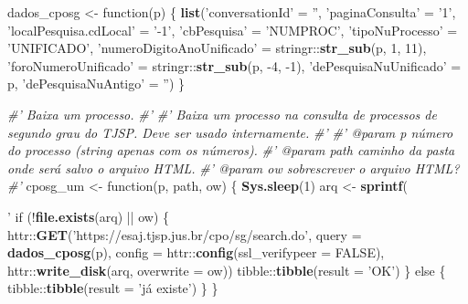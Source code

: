 \documentclass[]{book}
\newenvironment{Shaded}{\begin{snugshade}}{\end{snugshade}}
\newcommand{\KeywordTok}[1]{\textcolor[rgb]{0.13,0.29,0.53}{\textbf{{#1}}}}
\newcommand{\DataTypeTok}[1]{\textcolor[rgb]{0.13,0.29,0.53}{{#1}}}
\newcommand{\DecValTok}[1]{\textcolor[rgb]{0.00,0.00,0.81}{{#1}}}
\newcommand{\StringTok}[1]{\textcolor[rgb]{0.31,0.60,0.02}{{#1}}}
\newcommand{\CommentTok}[1]{\textcolor[rgb]{0.56,0.35,0.01}{\textit{{#1}}}}
\newcommand{\OtherTok}[1]{\textcolor[rgb]{0.56,0.35,0.01}{{#1}}}
\newcommand{\NormalTok}[1]{{#1}}
\begin{document}
\begin{Shaded}
\begin{Highlighting}[]
\NormalTok{dados_cposg <-}\StringTok{ }\NormalTok{function(p) \{}
  \KeywordTok{list}\NormalTok{(}\StringTok{'conversationId'} \NormalTok{=}\StringTok{ ''}\NormalTok{,}
       \StringTok{'paginaConsulta'} \NormalTok{=}\StringTok{ '1'}\NormalTok{,}
       \StringTok{'localPesquisa.cdLocal'} \NormalTok{=}\StringTok{ '-1'}\NormalTok{,}
       \StringTok{'cbPesquisa'} \NormalTok{=}\StringTok{ 'NUMPROC'}\NormalTok{,}
       \StringTok{'tipoNuProcesso'} \NormalTok{=}\StringTok{ 'UNIFICADO'}\NormalTok{,}
       \StringTok{'numeroDigitoAnoUnificado'} \NormalTok{=}\StringTok{ }\NormalTok{stringr::}\KeywordTok{str_sub}\NormalTok{(p, }\DecValTok{1}\NormalTok{, }\DecValTok{11}\NormalTok{),}
       \StringTok{'foroNumeroUnificado'} \NormalTok{=}\StringTok{ }\NormalTok{stringr::}\KeywordTok{str_sub}\NormalTok{(p, -}\DecValTok{4}\NormalTok{, -}\DecValTok{1}\NormalTok{),}
       \StringTok{'dePesquisaNuUnificado'} \NormalTok{=}\StringTok{ }\NormalTok{p,}
       \StringTok{'dePesquisaNuAntigo'} \NormalTok{=}\StringTok{ ''}\NormalTok{)}
\NormalTok{\}}

\CommentTok{#' Baixa um processo.}
\CommentTok{#'}
\CommentTok{#' Baixa um processo na consulta de processos de segundo grau do TJSP. Deve ser usado internamente.}
\CommentTok{#'}
\CommentTok{#' @param p número do processo (string apenas com os números).}
\CommentTok{#' @param path caminho da pasta onde será salvo o arquivo HTML.}
\CommentTok{#' @param ow sobrescrever o arquivo HTML?}
\CommentTok{#'}
\NormalTok{cposg_um <-}\StringTok{ }\NormalTok{function(p, path, ow) \{}
  \KeywordTok{Sys.sleep}\NormalTok{(}\DecValTok{1}\NormalTok{)}
  \NormalTok{arq <-}\StringTok{ }\KeywordTok{sprintf}\NormalTok{(}\StringTok{'%s/%s.html'}\NormalTok{, path, p)}
  \NormalTok{if (!}\KeywordTok{file.exists}\NormalTok{(arq) ||}\StringTok{ }\NormalTok{ow) \{}
    \NormalTok{httr::}\KeywordTok{GET}\NormalTok{(}\StringTok{'https://esaj.tjsp.jus.br/cpo/sg/search.do'}\NormalTok{,}
              \DataTypeTok{query =} \KeywordTok{dados_cposg}\NormalTok{(p),}
              \DataTypeTok{config =} \NormalTok{httr::}\KeywordTok{config}\NormalTok{(}\DataTypeTok{ssl_verifypeer =} \OtherTok{FALSE}\NormalTok{),}
              \NormalTok{httr::}\KeywordTok{write_disk}\NormalTok{(arq, }\DataTypeTok{overwrite =} \NormalTok{ow))}
    \NormalTok{tibble::}\KeywordTok{tibble}\NormalTok{(}\DataTypeTok{result =} \StringTok{'OK'}\NormalTok{)}
  \NormalTok{\} else \{}
    \NormalTok{tibble::}\KeywordTok{tibble}\NormalTok{(}\DataTypeTok{result =} \StringTok{'já existe'}\NormalTok{)}
  \NormalTok{\}}
\NormalTok{\}}

}
\end{Highlighting}
\end{Shaded}
\end{document}
